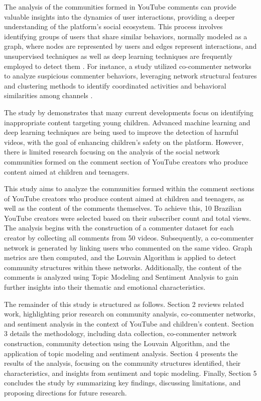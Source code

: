 \documentclass[12pt]{article}
\begin{document}
The analysis of the communities formed in YouTube comments can provide valuable 
insights into the dynamics of user interactions, providing a deeper understanding of 
the platform's social ecosystem. This process involves identifying groups of users that share similar
behaviors, normally modeled as a graph, where nodes are represented by users and edges represent 
interactions, and unsupervised techniques as well as deep learning techniques are frequently employed 
to detect them \cite{nooribakhsh2024community}. For instance, a study utilized co-commenter networks 
to analyze suspicious commenter behaviors, leveraging network structural features and clustering 
methods to identify coordinated activities and behavioral similarities among channels \cite{shajari2023} .

The study by \cite{app13064044} demonstrates that many current developments focus on identifying
inappropriate content targeting young children. Advanced machine learning and deep learning 
techniques are being used to improve the detection of harmful videos, with the goal of enhancing 
children's safety on the platform. However, there is limited research focusing on the analysis of 
the social network communities formed on the comment section of YouTube creators who 
produce content aimed at children and teenagers.

This study aims to analyze the communities formed within the comment sections of YouTube creators who 
produce content aimed at children and teenagers, as well as the content of the comments themselves. 
To achieve this, 10 Brazilian YouTube creators were selected based on their 
subscriber count and total views. The analysis begins with the construction of a commenter dataset for 
each creator by collecting all comments from 50 videos. Subsequently, a co-commenter network is 
generated by linking users who commented on the same video. Graph metrics are then computed, and the 
Louvain Algorithm is applied to detect community structures within these networks. Additionally, the 
content of the comments is analyzed using Topic Modeling and Sentiment Analysis to gain further 
insights into their thematic and emotional characteristics.

The remainder of this study is structured as follows. Section 2 reviews related work, highlighting 
prior research on community analysis, co-commenter networks, and sentiment analysis in the context 
of YouTube and children's content. Section 3 details the methodology, including data collection, 
co-commenter network construction, community detection using the Louvain Algorithm, and the application 
of topic modeling and sentiment analysis. Section 4 presents the results of the analysis, focusing 
on the community structures identified, their characteristics, and insights from sentiment and topic 
modeling. Finally, Section 5 concludes the study by summarizing key findings, discussing limitations, 
and proposing directions for future research.
\end{document}
